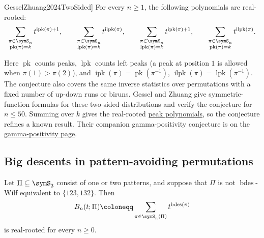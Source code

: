 \begin{conjecture}[Gessel--Zhuang, \cite[Conj.~7.1]{GesselZhuang2024TwoSided}]
\label{conjInversePeaks}
For every $n\geq1$, the following polynomials are real-rooted:
\[
  \sum_{\substack{\pi\in\symS_n\\ \operatorname{pk}(\pi)=k}}
  t^{\operatorname{ipk}(\pi)+1},
  \qquad
  \sum_{\substack{\pi\in\symS_n\\ \operatorname{lpk}(\pi)=k}}
  t^{\operatorname{ilpk}(\pi)},
  \qquad
  \sum_{\substack{\pi\in\symS_n\\ \operatorname{lpk}(\pi)=k}}
  t^{\operatorname{ipk}(\pi)+1},
  \qquad
  \sum_{\substack{\pi\in\symS_n\\ \operatorname{pk}(\pi)=k}}
  t^{\operatorname{ilpk}(\pi)}.
\]
\end{conjecture}

Here $\operatorname{pk}$ counts peaks, $\operatorname{lpk}$ counts left
peaks (a peak at position $1$ is allowed when $\pi(1)\gt\pi(2)$), and
$\operatorname{ipk}(\pi)=\operatorname{pk}(\pi^{-1})$,
$\operatorname{ilpk}(\pi)=\operatorname{lpk}(\pi^{-1})$.  The conjecture
also covers the same inverse statistics over permutations with a fixed
number of up-down runs or biruns.  Gessel and Zhuang give
symmetric-function formulas for these two-sided distributions and verify the
conjecture for $n\leq50$.  Summing over $k$ gives the real-rooted
\hyperref[peakGeneratingPolynomial]{peak polynomials}, so the conjecture
refines a known result.  Their companion gamma-positivity conjecture is on
the \hyperref[gammaPositivityOpenProblems]{gamma-positivity page}.


\subsection[openProblemsBigDescents]{Big descents in pattern-avoiding permutations}

\begin{conjecture}
\label{conjBigDescents}
Let $\Pi\subseteq\symS_3$ consist of one or two patterns, and suppose that
$\Pi$ is not $\operatorname{bdes}$-Wilf equivalent to $\{123,132\}$.  Then
\[
  B_n(t;\Pi)\coloneqq\sum_{\pi\in\symS_n(\Pi)}t^{\operatorname{bdes}(\pi)}
\]
is real-rooted for every $n\geq0$.
\end{conjecture}

